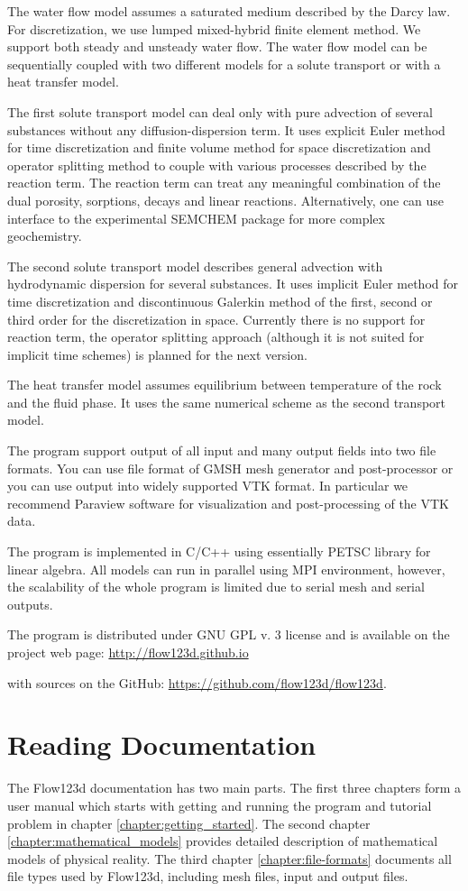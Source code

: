 \documentclass[12pt,a4paper]{report}
\begin{document}
The water flow model assumes a saturated medium described by the Darcy law. For discretization, we use lumped mixed-hybrid finite element method.
We support both steady and unsteady water flow. The water flow model can be sequentially coupled with two different models for a solute transport or with a heat transfer model.

The first solute transport model can deal only with pure advection of several substances without any diffusion-dispersion term. It uses 
explicit Euler method for time discretization and finite volume method for space discretization and operator splitting method to 
couple with various processes described by the reaction term. The reaction term can treat any meaningful combination of the dual porosity, sorptions, decays and linear reactions.
Alternatively, one can use interface to the experimental SEMCHEM package for more complex geochemistry.

The second solute transport model describes general advection with hydrodynamic dispersion for several substances. It uses implicit Euler method for time discretization and discontinuous Galerkin method of
the first, second or third order for the discretization in space. Currently there is no support for reaction term, the operator splitting approach (although it is not suited for implicit time schemes) 
is planned for the next version.

The heat transfer model assumes equilibrium between temperature of the rock and the fluid phase. It uses the same numerical scheme as the second transport model.

The program support output of all input and many output fields into two file formats. You can use file format of GMSH mesh generator and post-processor 
or you can use output into widely supported VTK format. In particular we recommend Paraview software for visualization and post-processing of the VTK data.

The program is implemented in C/C++ using essentially PETSC library for linear algebra. All models can run in parallel using MPI environment, however, 
the scalability of the whole program is limited due to serial mesh and serial outputs.


The program is distributed under GNU GPL v. 3 license and is available on the project web page:
\url{http://flow123d.github.io}

with sources on the GitHub:
\url{https://github.com/flow123d/flow123d}.


\section{Reading Documentation}
The Flow123d documentation has two main parts. The first three chapters form a user manual which
starts with getting and running the program and tutorial problem in chapter \ref{chapter:getting_started}. 
The second chapter \ref{chapter:mathematical_models} provides detailed description of mathematical models
of physical reality. The third chapter \ref{chapter:file-formats} documents all file types used by Flow123d, 
including mesh files, input and output files.
\end{document}
